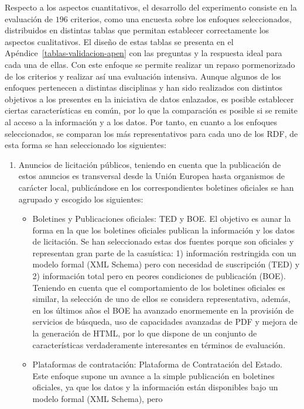 \begin{enumerate}
Respecto a los aspectos cuantitativos, el desarrollo del experimento consiste en la evaluación de $196$ criterios, como una 
encuesta sobre los enfoques seleccionados, distribuidos en distintas tablas que permitan establecer correctamente los 
aspectos cualitativos. El diseño de estas tablas se presenta en el Apéndice~\ref{tablas-validacion-apen} con las preguntas 
y la respuesta ideal para cada una de ellas. Con este enfoque se permite realizar un repaso pormenorizado de los criterios 
y realizar así una evaluación intensiva. Aunque algunos de los enfoques pertenecen a distintas disciplinas y han sido 
realizados con distintos objetivos a los presentes en la iniciativa de datos enlazados, es posible establecer 
ciertas características en común, por lo que la comparación es posible si se remite al acceso a la información 
y a los datos. Por tanto, en cuanto a los enfoques seleccionados, se comparan los más representativos 
para cada uno de los \datasets RDF, de esta forma se han seleccionado los siguientes:
\begin{enumerate}
 \item Anuncios de licitación públicos, teniendo en cuenta que la publicación de estos anuncios es transversal 
desde la Unión Europea hasta organismos de carácter local, publicándose en los correspondientes boletines oficiales se han 
agrupado y escogido los siguientes:
\begin{itemize}
 \item Boletines y Publicaciones oficiales: \gls{TED} y \gls{BOE}. El objetivo es aunar la forma en la que los boletines 
oficiales publican la información y los datos de licitación. Se han seleccionado estas dos fuentes porque 
son oficiales y representan gran parte de la casuística: 1) información restringida con un modelo formal (\gls{XML Schema}) pero con necesidad 
de suscripción (TED) y 2) información total pero en peores condiciones de publicación (BOE). Teniendo en cuenta 
que el comportamiento de los boletines oficiales es similar, la selección de uno de ellos se considera representativa, además, 
en los últimos años el BOE ha avanzado enormemente en la provisión de servicios de búsqueda, uso de capacidades avanzadas 
de \gls{PDF} y mejora de la generación de \gls{HTML}, por lo que dispone de un conjunto de características verdaderamente interesantes 
en términos de evaluación.
 \item Plataformas de contratación: Plataforma de Contratación del Estado. Este enfoque supone un avance a la simple 
publicación en boletines oficiales, ya que los datos y la información están disponibles bajo un modelo formal (XML Schema), pero 

\end{itemize}
\end{enumerate}
\end{enumerate}
